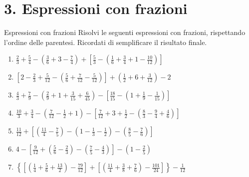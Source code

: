 \condnewpage

\section*{3. Espressioni con frazioni}

\begin{esercizio}{Espressioni con frazioni}
Risolvi le seguenti espressioni con frazioni, rispettando l'ordine delle parentesi. Ricordati di semplificare il risultato finale.

\begin{enumerate}[label=\alph*)]
  \item $\frac{2}{3} + \frac{5}{4} - \left(\frac{3}{6} + 3 - \frac{7}{4}\right) + \left[\frac{5}{3} - \left(\frac{1}{6} + \frac{3}{4} + 1 - \frac{10}{12}\right)\right]$
  \responsespace{4.2cm}

  \item $\left[2 - \frac{2}{3} + \frac{5}{12} - \left(\frac{5}{6} + \frac{7}{12} - \frac{5}{12}\right)\right] + \left(\frac{1}{2} + 6 + \frac{3}{12}\right) - 2$
  \responsespace{4.2cm}

  \item $\frac{4}{3} + \frac{7}{9} - \left(\frac{2}{9} + 1 + \frac{3}{15} + \frac{6}{45}\right) - \left[\frac{18}{15} - \left(1 + \frac{1}{9} - \frac{1}{15}\right)\right]$
  \responsespace{4.2cm}

  \item $\frac{10}{3} + \frac{3}{4} - \left(\frac{7}{12} - \frac{1}{2} + 1\right) - \left[\frac{7}{12} + 3 + \frac{1}{2} - \left(\frac{8}{3} - \frac{9}{4} + \frac{4}{6}\right)\right]$
  \responsespace{4.2cm}

  \item $\frac{11}{12} + \left[ \left( \frac{11}{4} - \frac{7}{5} \right) - \left( 1 - \frac{1}{3} - \frac{1}{2} \right) - \left( \frac{8}{5} - \frac{7}{6} \right) \right]$
  \responsespace{4.2cm}

  \item $4 - \left[ \frac{9}{12} + \left( \frac{5}{6} - \frac{2}{3} \right) - \left( \frac{7}{5} - \frac{4}{3} \right) \right] - \left( 1 - \frac{2}{5} \right)$
  \responsespace{4.2cm}

  \item $\left\{ \left[ \left( \frac{1}{4} + \frac{5}{6} + \frac{13}{2} \right) - \frac{79}{12} \right] + \left[ \left( \frac{11}{4} + \frac{3}{8} + \frac{7}{6} \right) - \frac{101}{24} \right] \right\} - \frac{1}{12}$
  \responsespace{4.2cm}
\end{enumerate}


\end{esercizio}
